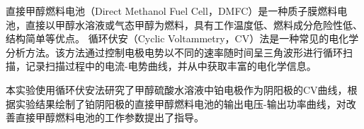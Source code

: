 直接甲醇燃料电池（Direct Methanol Fuel Cell，DMFC）是一种质子膜燃料电池，直接以甲醇水溶液或气态甲醇为燃料，具有工作温度低、燃料成分危险性低、结构简单等优点。
循环伏安（Cyclic Voltammetry，CV）法是一种常见的电化学分析方法。该方法通过控制电极电势以不同的速率随时间呈三角波形进行循环扫描，记录扫描过程中的电流-电势曲线，并从中获取丰富的电化学信息。\par
本实验使用循环伏安法研究了甲醇硫酸水溶液中铂电极作为阴阳极的CV曲线，根据实验结果绘制了铂阴阳极的直接甲醇燃料电池的输出电压-输出功率曲线，对改善直接甲醇燃料电池的工作参数提出了指导。 \par 